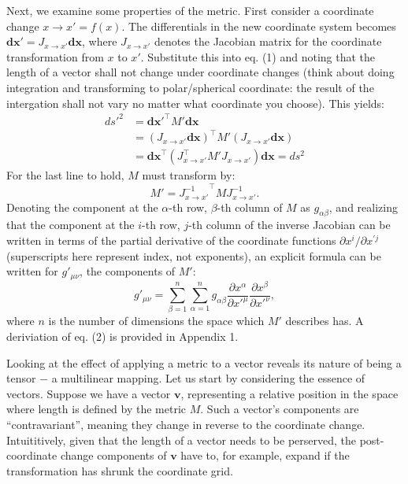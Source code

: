 \documentclass[conference]{IEEEtran}
\begin{document}
Next, we examine some properties of the metric. First consider a coordinate 
change $x \rightarrow x' = f(x)$. The differentials in the new coordinate system becomes
$\mathbf{dx}' = J_{x \rightarrow x'} \mathbf{dx}$, where $J_{x \rightarrow x'}$ denotes the Jacobian matrix for the coordinate 
transformation from $x$ to $x'$. Substitute this into eq. (1) and noting that the length 
of a vector shall not change under coordinate changes (think about doing integration 
and transforming to polar/spherical coordinate: the result of the intergation 
shall not vary no matter what coordinate you choose). This yields:
\begin{align*}
ds'^2 &= \mathbf{dx}'^\top M' \mathbf{dx} \\
&= (J_{x \rightarrow x'} \mathbf{dx} )^\top M' (J_{x \rightarrow x'} \mathbf{dx} ) \\
&= \mathbf{dx}^\top (J_{x \rightarrow x'}^\top M' J_{x \rightarrow x'}) \mathbf{dx} = ds^2
\end{align*}
For the last line to hold, $M$ must transform by:
\[
M' = {J_{x \rightarrow x'}^{-1}}^\top M J_{x \rightarrow x'}^{-1}.
\]
Denoting the component at the $\alpha$-th row, $\beta$-th column of $M$ as $g_{\alpha\beta}$, and 
realizing that the component at the $i$-th row, $j$-th column of the inverse Jacobian 
can be written in terms of the partial derivative of the coordinate functions 
$\partial x^i / \partial x^{\prime j}$ (superscripts here represent index, not exponents), an explicit formula can be written for $g'_{\mu\nu}$, 
the components of $M'$:
\[
g'_{\mu\nu} = \sum_{\beta=1}^n 
\sum_{\alpha=1}^n g_{\alpha\beta} \frac{\partial x^\alpha}{\partial x'^\mu} 
\frac{\partial x^\beta}{\partial x'^\nu},
\tag{2}
\]
where $n$ is the number of dimensions the space which $M'$ describes has. A deriviation of 
eq. (2) is provided in Appendix 1.

Looking at the effect of applying a metric to a vector reveals its nature 
of being a tensor $-$ a multilinear mapping. Let us start by considering the essence of vectors. Suppose we have a vector $\mathbf{v}$, representing 
a relative position in the space where length is defined by the metric $M$. 
Such a vector's components are “contravariant”, meaning they change in reverse to 
the coordinate change. Intuititively, given that the length of a vector needs 
to be perserved, the post-coordinate change components of $\mathbf{v}$ have to, for example, 
expand if the transformation has shrunk the coordinate grid. 
\end{document}
